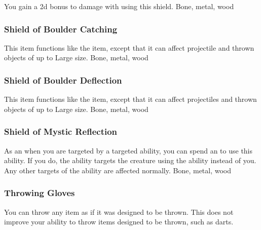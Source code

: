 You gain a \plus2d bonus to damage with  using this shield.
 
 Bone, metal, wood
\lowercase{\hypertarget{item:Shield of Boulder Catching}{}}\label{item:Shield of Boulder Catching}
\hypertarget{item:Shield of Boulder Catching}{\subsubsection{Shield of Boulder Catching\hfill{}}}
This item functions like the  item, except that it can affect projectile and thrown objects of up to Large size.
 
 Bone, metal, wood
\lowercase{\hypertarget{item:Shield of Boulder Deflection}{}}\label{item:Shield of Boulder Deflection}
\hypertarget{item:Shield of Boulder Deflection}{\subsubsection{Shield of Boulder Deflection\hfill{}}}
This item functions like the  item, except that it can affect projectiles and thrown objects of up to Large size.
 
 Bone, metal, wood
\lowercase{\hypertarget{item:Shield of Mystic Reflection}{}}\label{item:Shield of Mystic Reflection}
\hypertarget{item:Shield of Mystic Reflection}{\subsubsection{Shield of Mystic Reflection\hfill{}}}
As an  when you are targeted by a targeted  ability, you can spend an  to use this ability.
If you do, the ability targets the creature using the ability instead of you.
Any other targets of the ability are affected normally.
 
 Bone, metal, wood
\lowercase{\hypertarget{item:Throwing Gloves}{}}\label{item:Throwing Gloves}
\hypertarget{item:Throwing Gloves}{\subsubsection{Throwing Gloves\hfill{}}}
You can throw any item as if it was designed to be thrown.
This does not improve your ability to throw items designed to be thrown, such as darts.
